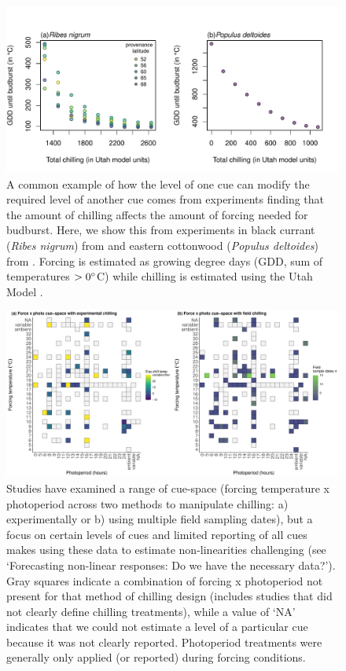 \documentclass[11pt,letter]{article}
\begin{document}
\clearpage
\begin{figure}
\centering
\includegraphics[width=1\textwidth]{..//..//analyses/limitingcues/figures/gddbyutahpretty.pdf}
\caption{A common example of how the level of one cue can modify the required level of another cue comes from experiments finding that the amount of chilling affects the amount of forcing needed for budburst. Here, we show this from experiments in black currant (\emph{Ribes nigrum}) from \citet{Sonsteby:2014aa} and eastern cottonwood (\emph{Populus deltoides}) from \citet{Thielges:1976aa}. Forcing is estimated as growing degree days (GDD, sum of temperatures $>0\degree$C) while chilling is estimated using the Utah Model \citep[see][]{richardson1974}.} %
  \label{fig:gddbyutah} 
\end{figure}


\clearpage
\begin{figure}[t!]
\centering
\includegraphics[width=1.1\textwidth]{..//..//analyses/limitingcues/figures/heatmapphotoxforcexchill2panel.pdf}
\caption{Studies have examined a range of cue-space (forcing temperature x photoperiod across two methods to manipulate chilling: a) experimentally or b) using multiple field sampling dates), but a focus on certain levels of cues and limited reporting of all cues makes using these data to estimate non-linearities challenging (see `Forecasting non-linear responses: Do we have the necessary data?'). Gray squares indicate a combination of forcing x photoperiod not present for that method of chilling design (includes studies that did not clearly define chilling treatments), while a value of `NA' indicates that we could not estimate a level of a particular cue because it was not clearly reported.  Photoperiod treatments were generally only applied (or reported) during forcing conditions.}
  \label{fig:heatmaps} 
\end{figure}
\end{document}
